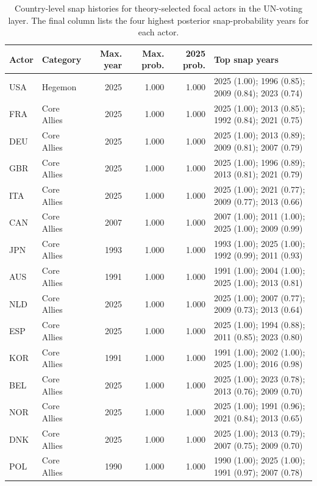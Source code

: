 \begin{table}
\centering
\caption{Country-level snap histories for theory-selected focal actors in the UN-voting layer. The final column lists the four highest posterior snap-probability years for each actor.}
\label{tab:country-snap-history}
\scriptsize
\begin{tabularx}{\textwidth}{@{}l l r r r X@{}}
\toprule
\textbf{Actor} & \textbf{Category} & \textbf{Max. year} & \textbf{Max. prob.} & \textbf{2025 prob.} & \textbf{Top snap years} \\
\midrule
USA & Hegemon & 2025 & 1.000 & 1.000 & 2025 (1.00); 1996 (0.85); 2009 (0.84); 2023 (0.74) \\
FRA & Core Allies & 2025 & 1.000 & 1.000 & 2025 (1.00); 2013 (0.85); 1992 (0.84); 2021 (0.75) \\
DEU & Core Allies & 2025 & 1.000 & 1.000 & 2025 (1.00); 2013 (0.89); 2009 (0.81); 2007 (0.79) \\
GBR & Core Allies & 2025 & 1.000 & 1.000 & 2025 (1.00); 1996 (0.89); 2013 (0.81); 2021 (0.79) \\
ITA & Core Allies & 2025 & 1.000 & 1.000 & 2025 (1.00); 2021 (0.77); 2009 (0.77); 2013 (0.66) \\
CAN & Core Allies & 2007 & 1.000 & 1.000 & 2007 (1.00); 2011 (1.00); 2025 (1.00); 2009 (0.99) \\
JPN & Core Allies & 1993 & 1.000 & 1.000 & 1993 (1.00); 2025 (1.00); 1992 (0.99); 2011 (0.93) \\
AUS & Core Allies & 1991 & 1.000 & 1.000 & 1991 (1.00); 2004 (1.00); 2025 (1.00); 2013 (0.81) \\
NLD & Core Allies & 2025 & 1.000 & 1.000 & 2025 (1.00); 2007 (0.77); 2009 (0.73); 2013 (0.64) \\
ESP & Core Allies & 2025 & 1.000 & 1.000 & 2025 (1.00); 1994 (0.88); 2011 (0.85); 2023 (0.80) \\
KOR & Core Allies & 1991 & 1.000 & 1.000 & 1991 (1.00); 2002 (1.00); 2025 (1.00); 2016 (0.98) \\
BEL & Core Allies & 2025 & 1.000 & 1.000 & 2025 (1.00); 2023 (0.78); 2013 (0.76); 2009 (0.70) \\
NOR & Core Allies & 2025 & 1.000 & 1.000 & 2025 (1.00); 1991 (0.96); 2021 (0.84); 2013 (0.65) \\
DNK & Core Allies & 2025 & 1.000 & 1.000 & 2025 (1.00); 2013 (0.79); 2007 (0.75); 2009 (0.70) \\
POL & Core Allies & 1990 & 1.000 & 1.000 & 1990 (1.00); 2025 (1.00); 1991 (0.97); 2007 (0.78) \\

\end{tabularx}
\end{table}
